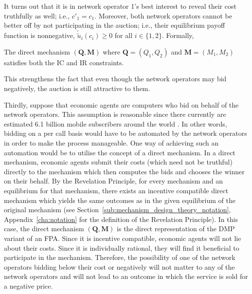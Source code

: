 It turns out that it is in network operator 1's best interest to reveal their cost truthfully as well; i.e., $c'_1=c_1$. Moreover, both network operators cannot be better off by not participating in the auction; i.e., their equilibrium payoff function is nonnegative, $\tilde{\tilde{u}}_i(c_i)\ge 0$ for all $i\in\{1,2\}$. Formally,
\begin{proposition}
\label{prop:pcomp_direct_mechanism_direct}
The direct mechanism $(\mathbf{Q},\mathbf{M})$ where $\mathbf{Q}=(Q_1,Q_2)$ and $\mathbf{M}=(M_1,M_2)$ satisfies both the IC and IR constraints.
\end{proposition}
\noindent This strengthens the fact that even though the network operators may bid negatively, the auction is still attractive to them.

Thirdly, suppose that economic agents are computers who bid on behalf of the network operators. This assumption is reasonable since there currently are estimated 6.1 billion mobile subscribers around the world \cite{Ericsson2011}. In other words, bidding on a per call basis would have to be automated by the network operators in order to make the process manageable. One way of achieving such an automation would be to utilise the concept of a direct mechanism. In a direct mechanism, economic agents submit their costs (which need not be truthful) directly to the mechanism which then computes the bids and chooses the winner on their behalf. By the Revelation Principle, for every mechanism and an equilibrium for that mechanism, there exists an incentive compatible direct mechanism which yields the same outcomes as in the given equilibrium of the original mechanism (see Section~\ref{sub:mechanism_design_theory_notation}, Appendix~\ref{cha:notation} for the definition of the Revelation Principle). In this case, the direct mechanism $(\mathbf{Q},\mathbf{M})$ is the direct representation of the DMP variant of an FPA. Since it is incentive compatible, economic agents will not lie about their costs. Since it is individually rational, they will find it beneficial to participate in the mechanism. Therefore, the possibility of one of the network operators bidding below their cost or negatively will not matter to any of the network operators and will not lead to an outcome in which the service is sold for a negative price.

